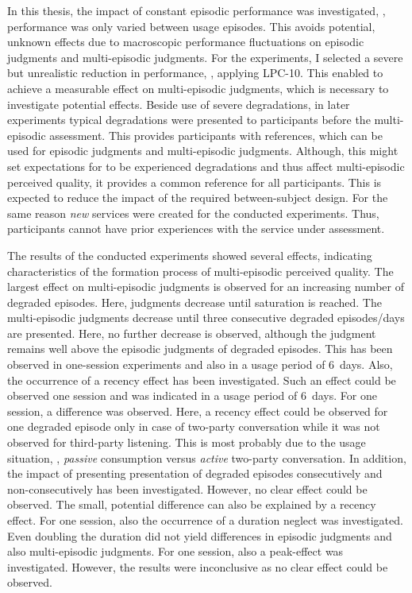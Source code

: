 In this thesis, the impact of constant episodic performance was investigated, \ie, performance was only varied between usage episodes.
This avoids potential, unknown effects due to macroscopic performance fluctuations on episodic judgments and multi-episodic judgments.
For the experiments, I selected a severe but unrealistic reduction in performance, \ie, applying LPC-10.
This enabled to achieve a measurable effect on multi-episodic judgments, which is necessary to investigate potential effects.
Beside use of severe degradations, in later experiments typical degradations were presented to participants before the multi-episodic assessment.
This provides participants with references, which can be used for episodic judgments and multi-episodic judgments.
Although, this might set expectations for to be experienced degradations and thus affect multi-episodic perceived quality, it provides a common reference for all participants.
This is expected to reduce the impact of the required between-subject design.
For the same reason \emph{new} services were created for the conducted experiments.
Thus, participants cannot have prior experiences with the service under assessment.

The results of the conducted experiments showed several effects, indicating characteristics of the formation process of multi-episodic perceived quality.
The largest effect on multi-episodic judgments is observed for an increasing number of degraded episodes.
Here, judgments decrease until saturation is reached.
The multi-episodic judgments decrease until three consecutive degraded episodes/days are presented.
Here, no further decrease is observed, although the judgment remains well above the episodic judgments of degraded episodes.
This has been observed in one-session experiments and also in a usage period of 6~days.
Also, the occurrence of a recency effect has been investigated.
Such an effect could be observed one session and was indicated in a usage period of 6~days.
For one session, a difference was observed.
Here, a recency effect could be observed for one degraded episode only in case of two-party conversation while it was not observed for third-party listening.
This is most probably due to the usage situation, \ie, \emph{passive} consumption versus \emph{active} two-party conversation.
In addition, the impact of presenting presentation of degraded episodes consecutively and non-consecutively has been investigated.
However, no clear effect could be observed.
The small, potential difference can also be explained by a recency effect.
For one session, also the occurrence of a duration neglect was investigated.
Even doubling the duration did not yield differences in episodic judgments and also multi-episodic judgments.
For one session, also a peak-effect was investigated.
However, the results were inconclusive as no clear effect could be observed.

